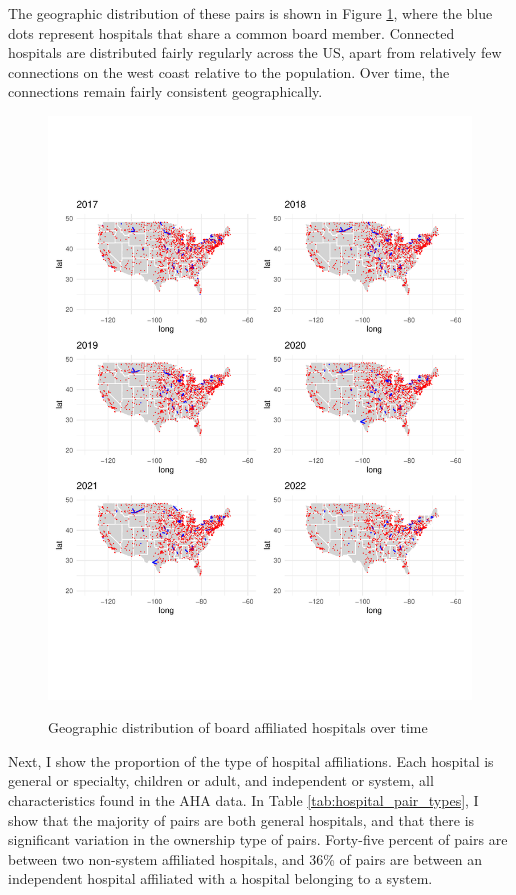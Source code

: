 \documentclass[12pt]{article}
\begin{document}
    The geographic distribution of these pairs is shown in Figure \ref{fig:connected_maps}, where the blue dots represent hospitals that share a common board member. Connected hospitals are distributed fairly regularly across the US, apart from relatively few connections on the west coast relative to the population. Over time, the connections remain fairly consistent geographically.

    \begin{figure}[ht!]
        \centering
        \caption{Geographic distribution of board affiliated hospitals over time}
        \includegraphics[width=.8\textwidth]{Objects/connected_maps.pdf}
        \label{fig:connected_maps}
    \end{figure}



    Next, I show the proportion of the type of hospital affiliations. Each hospital is general or specialty, children or adult, and independent or system, all characteristics found in the AHA data. In Table \ref{tab:hospital_pair_types}, I show that the majority of pairs are both general hospitals, and that there is significant variation in the ownership type of pairs. Forty-five percent of pairs are between two non-system affiliated hospitals, and 36\% of pairs are between an independent hospital affiliated with a hospital belonging to a system. 
\end{document}
